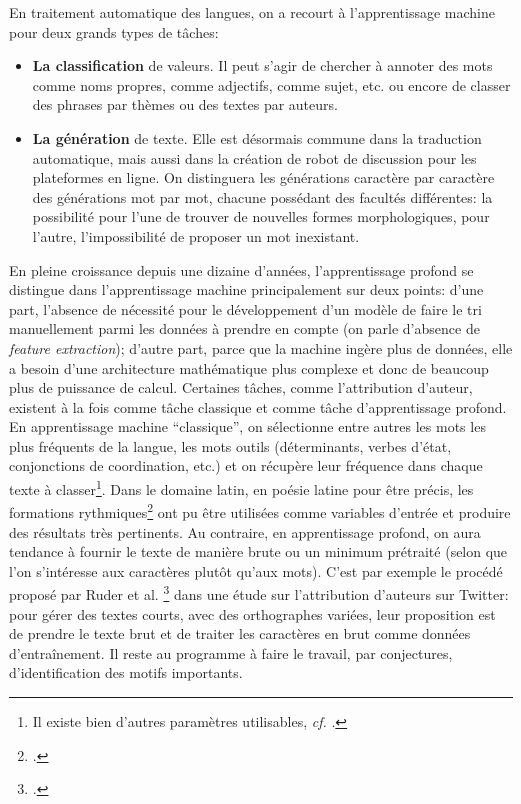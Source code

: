 En traitement automatique des langues, on a recourt à l'apprentissage machine pour deux grands types de tâches:
\begin{itemize}
    \item \textbf{La classification} de valeurs. Il peut s'agir de chercher à annoter des mots comme noms propres, comme adjectifs, comme sujet, etc. ou encore de classer des phrases par thèmes ou des textes par auteurs.
    \item \textbf{La génération} de texte. Elle est désormais commune dans la traduction automatique, mais aussi dans la création de robot de discussion pour les plateformes en ligne. On distinguera les générations caractère par caractère des générations mot par mot, chacune possédant des facultés différentes: la possibilité pour l'une de trouver de nouvelles formes morphologiques, pour l'autre, l'impossibilité de proposer un mot inexistant.
\end{itemize}{}

En pleine croissance depuis une dizaine d'années, l'apprentissage profond se distingue dans l'apprentissage machine principalement sur deux points: d'une part, l'absence de nécessité pour le développement d'un modèle de faire le tri manuellement parmi les données à prendre en compte (on parle d'absence de \textit{feature extraction}); d'autre part, parce que la machine ingère plus de données, elle a besoin d'une architecture mathématique plus complexe et donc de beaucoup plus de puissance de calcul. Certaines tâches, comme l'attribution d'auteur, existent à la fois comme tâche classique et comme tâche d'apprentissage profond. En apprentissage machine \enquote{classique}, on sélectionne entre autres les mots les plus fréquents de la langue, les mots outils (déterminants, verbes d'état, conjonctions de coordination, etc.) et on récupère leur fréquence dans chaque texte à classer\footnote{Il existe bien d'autres paramètres utilisables, \textit{cf.} \textcite{Cafieroeaax5489}.}. Dans le domaine latin, en poésie latine pour être précis, les formations rythmiques\footcite{nagy_metre_2021} ont pu être utilisées comme variables d'entrée et produire des résultats très pertinents. Au contraire, en apprentissage profond, on aura tendance à fournir le texte de manière brute ou un minimum prétraité (selon que l'on s'intéresse aux caractères plutôt qu'aux mots). C'est par exemple le procédé proposé par Ruder et al. \footcite{ruder_character-level_2016} dans une étude sur l'attribution d'auteurs sur Twitter: pour gérer des textes courts, avec des orthographes variées, leur proposition est de prendre le texte brut et de traiter les caractères en brut comme données d'entraînement. Il reste au programme à faire le travail, par conjectures, d'identification des motifs importants.

